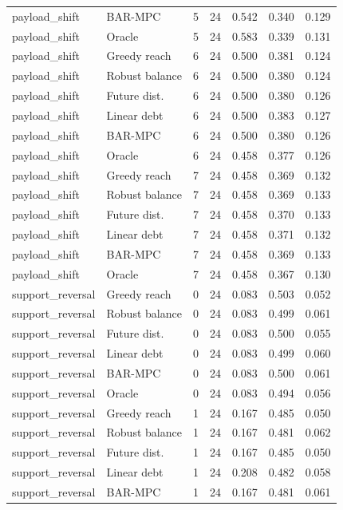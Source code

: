 \begin{longtable}{llrrrrr}
payload\_shift & BAR-MPC & 5 & 24 & 0.542 & 0.340 & 0.129 \\
payload\_shift & Oracle & 5 & 24 & 0.583 & 0.339 & 0.131 \\
payload\_shift & Greedy reach & 6 & 24 & 0.500 & 0.381 & 0.124 \\
payload\_shift & Robust balance & 6 & 24 & 0.500 & 0.380 & 0.124 \\
payload\_shift & Future dist. & 6 & 24 & 0.500 & 0.380 & 0.126 \\
payload\_shift & Linear debt & 6 & 24 & 0.500 & 0.383 & 0.127 \\
payload\_shift & BAR-MPC & 6 & 24 & 0.500 & 0.380 & 0.126 \\
payload\_shift & Oracle & 6 & 24 & 0.458 & 0.377 & 0.126 \\
payload\_shift & Greedy reach & 7 & 24 & 0.458 & 0.369 & 0.132 \\
payload\_shift & Robust balance & 7 & 24 & 0.458 & 0.369 & 0.133 \\
payload\_shift & Future dist. & 7 & 24 & 0.458 & 0.370 & 0.133 \\
payload\_shift & Linear debt & 7 & 24 & 0.458 & 0.371 & 0.132 \\
payload\_shift & BAR-MPC & 7 & 24 & 0.458 & 0.369 & 0.133 \\
payload\_shift & Oracle & 7 & 24 & 0.458 & 0.367 & 0.130 \\
support\_reversal & Greedy reach & 0 & 24 & 0.083 & 0.503 & 0.052 \\
support\_reversal & Robust balance & 0 & 24 & 0.083 & 0.499 & 0.061 \\
support\_reversal & Future dist. & 0 & 24 & 0.083 & 0.500 & 0.055 \\
support\_reversal & Linear debt & 0 & 24 & 0.083 & 0.499 & 0.060 \\
support\_reversal & BAR-MPC & 0 & 24 & 0.083 & 0.500 & 0.061 \\
support\_reversal & Oracle & 0 & 24 & 0.083 & 0.494 & 0.056 \\
support\_reversal & Greedy reach & 1 & 24 & 0.167 & 0.485 & 0.050 \\
support\_reversal & Robust balance & 1 & 24 & 0.167 & 0.481 & 0.062 \\
support\_reversal & Future dist. & 1 & 24 & 0.167 & 0.485 & 0.050 \\
support\_reversal & Linear debt & 1 & 24 & 0.208 & 0.482 & 0.058 \\
support\_reversal & BAR-MPC & 1 & 24 & 0.167 & 0.481 & 0.061 \\

\end{longtable}
